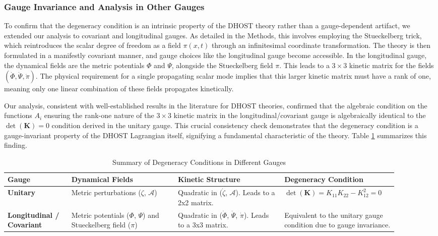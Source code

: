 \documentclass[twocolumn]{aastex631}
\begin{document}
\subsubsection{Gauge Invariance and Analysis in Other Gauges}
To confirm that the degeneracy condition is an intrinsic property of the DHOST theory rather than a gauge-dependent artifact, we extended our analysis to covariant and longitudinal gauges. As detailed in the Methods, this involves employing the Stueckelberg trick, which reintroduces the scalar degree of freedom as a field $\pi(x,t)$ through an infinitesimal coordinate transformation. The theory is then formulated in a manifestly covariant manner, and gauge choices like the longitudinal gauge become accessible. In the longitudinal gauge, the dynamical fields are the metric potentials $\Phi$ and $\Psi$, alongside the Stueckelberg field $\pi$. This leads to a $3 \times 3$ kinetic matrix for the fields $(\dot{\Phi}, \dot{\Psi}, \dot{\pi})$. The physical requirement for a single propagating scalar mode implies that this larger kinetic matrix must have a rank of one, meaning only one linear combination of these fields propagates kinetically.

Our analysis, consistent with well-established results in the literature for DHOST theories, confirmed that the algebraic condition on the functions $A_i$ ensuring the rank-one nature of the $3 \times 3$ kinetic matrix in the longitudinal/covariant gauge is algebraically identical to the $\det(\mathbf{K})=0$ condition derived in the unitary gauge. This crucial consistency check demonstrates that the degeneracy condition is a gauge-invariant property of the DHOST Lagrangian itself, signifying a fundamental characteristic of the theory. Table \ref{tab:degeneracy_summary} summarizes this finding.

\begin{table}[h!]
\centering
\caption{Summary of Degeneracy Conditions in Different Gauges}
\label{tab:degeneracy_summary}
\begin{tabular}{p{0.15\linewidth}|p{0.25\linewidth}|p{0.25\linewidth}|p{0.25\linewidth}}
\hline
\textbf{Gauge} & \textbf{Dynamical Fields} & \textbf{Kinetic Structure} & \textbf{Degeneracy Condition} \\ \hline
\textbf{Unitary} & Metric perturbations ($\zeta$, $\mathcal{A}$) & Quadratic in ($\dot{\zeta}$, $\mathcal{A}$). Leads to a 2x2 matrix. & $\det(\mathbf{K}) = K_{11}K_{22} - K_{12}^2 = 0$ \\
\textbf{Longitudinal / Covariant} & Metric potentials ($\Phi$, $\Psi$) and Stueckelberg field ($\pi$) & Quadratic in ($\dot{\Phi}$, $\dot{\Psi}$, $\dot{\pi}$). Leads to a 3x3 matrix. & Equivalent to the unitary gauge condition due to gauge invariance. \\ \hline
\end{tabular}
\end{table}
\end{document}
